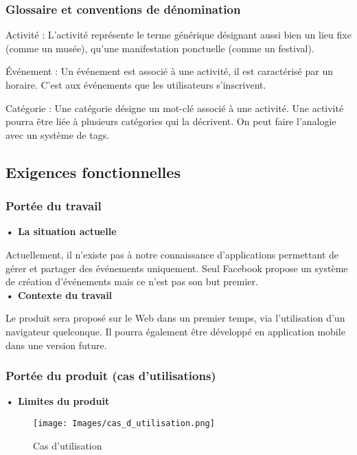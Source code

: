 \subsubsection{Glossaire et conventions de dénomination}

Activité : L’activité représente le terme générique désignant aussi bien un lieu fixe (comme un musée), qu’une manifestation ponctuelle (comme un festival).

Événement : Un événement est associé à une activité, il est caractérisé par un horaire. C’est aux événements que les utilisateurs s’inscrivent.

Catégorie : Une catégorie désigne un mot-clé associé à une activité. Une activité pourra être liée à plusieurs catégories qui la décrivent. On peut faire l’analogie avec un système de tags.

\subsection{Exigences fonctionnelles}

\subsubsection{Portée du travail}

\textbf{• La situation actuelle}

Actuellement, il n’existe pas à notre connaissance d’applications permettant de gérer et partager des événements uniquement. Seul Facebook propose un système de création d’événements mais ce n’est pas son but premier. \\

\textbf{• Contexte du travail}

Le produit sera proposé sur le Web dans un premier temps, via l’utilisation d’un navigateur quelconque. Il pourra également être développé en application mobile dans une version future.

\subsubsection{Portée du produit (cas d’utilisations)}

\textbf{• Limites du produit}

\begin{figure}[H]
	\centerline{\texttt{[image: Images/cas\_d\_utilisation.png]}}
	\caption{Cas d'utilisation}
\end{figure}

